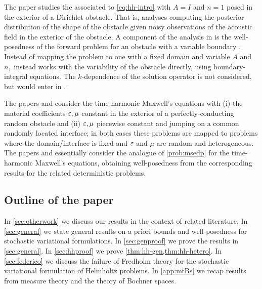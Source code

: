 The paper \cite{BuGh:14} studies the  associated to \eqref{eq:hh-intro} with $A=I$ and $n=1$  posed in the  exterior of a Dirichlet obstacle. That is, \cite{BuGh:14} analyses computing the posterior distribution of the shape of the obstacle given noisy observations of the acoustic field in the exterior of the obstacle. A component of the analysis in \cite{BuGh:14} is the well-posedness of the forward problem for an obstacle with a variable boundary \cite[Proposition 3.5]{BuGh:14}. Instead of mapping the problem to one with  a fixed domain and variable $A$ and $n,$ \cite{BuGh:14} instead works with the variability of the obstacle directly, using boundary-integral equations. The $k$-dependence of the solution operator is not considered, but would enter in \cite[Lemma 3.1]{BuGh:14}.


The papers \cite{JeScZe:17} and \cite{JeSc:16} consider the time-harmonic Maxwell's equations with (i) the material coefficients $\varepsilon,\mu$ constant in the exterior of a perfectly-conducting random obstacle and (ii) $\varepsilon,\mu$ piecewise constant and jumping on a common randomly located interface; in both cases these problems are mapped to problems where the domain/interface is fixed and $\varepsilon$ and $\mu$ are random and heterogeneous. The papers \cite{JeScZe:17} and \cite{JeSc:16} essentially consider the analogue of \cref{prob:msedp} for the time-harmonic Maxwell's equations, obtaining well-posedness from the corresponding results for the related deterministic problems.

\subsection{Outline of the paper} In \cref{sec:otherwork} we discuss our results in the context of related literature. In \cref{sec:general} we  state general results on a priori bounds and well-posedness for stochastic variational formulations. In \cref{sec:genproof} we prove the results in \cref{sec:general}. In \cref{sec:hhproof} we prove \cref{thm:hh-gen,thm:hh-hetero}. In \cref{sec:federico} we discuss the failure of Fredholm theory for the stochastic variational formulation of Helmholtz problems. In \cref{app:mtBs} we recap results from measure theory and the theory of Bochner spaces.
